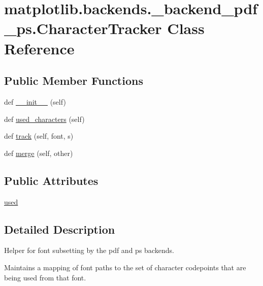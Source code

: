 \hypertarget{classmatplotlib_1_1backends_1_1__backend__pdf__ps_1_1CharacterTracker}{}\section{matplotlib.\+backends.\+\_\+backend\+\_\+pdf\+\_\+ps.\+Character\+Tracker Class Reference}
\label{classmatplotlib_1_1backends_1_1__backend__pdf__ps_1_1CharacterTracker}
\subsection*{Public Member Functions}
\begin{DoxyCompactItemize}
\item 
def \hyperlink{classmatplotlib_1_1backends_1_1__backend__pdf__ps_1_1CharacterTracker_a8a5b0d2f742231dbf9f65529acf830f7}{\+\_\+\+\_\+init\+\_\+\+\_\+} (self)
\item 
def \hyperlink{classmatplotlib_1_1backends_1_1__backend__pdf__ps_1_1CharacterTracker_a260571ac34a09b8714101ba15cea903f}{used\+\_\+characters} (self)
\item 
def \hyperlink{classmatplotlib_1_1backends_1_1__backend__pdf__ps_1_1CharacterTracker_ae4275527abf40055927a12ed848d64aa}{track} (self, font, s)
\item 
def \hyperlink{classmatplotlib_1_1backends_1_1__backend__pdf__ps_1_1CharacterTracker_a988ed3a0d0ffff56c2379987402d1a3d}{merge} (self, other)
\end{DoxyCompactItemize}
\subsection*{Public Attributes}
\begin{DoxyCompactItemize}
\item 
\hyperlink{classmatplotlib_1_1backends_1_1__backend__pdf__ps_1_1CharacterTracker_a5cea4a78fc820ecadde9192788950415}{used}
\end{DoxyCompactItemize}


\subsection{Detailed Description}
\begin{DoxyVerb}Helper for font subsetting by the pdf and ps backends.

Maintains a mapping of font paths to the set of character codepoints that
are being used from that font.
\end{DoxyVerb}
 

